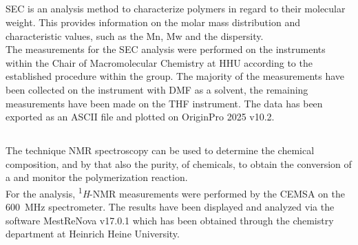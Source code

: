 \documentclass[11pt]{scrreport}
\begin{document}
	\subsection{}
	\Gls{SEC} is an analysis method to characterize polymers in regard to their molecular weight. This provides information on the molar mass distribution and characteristic values, such as the \gls{Mn}, \gls{Mw} and the \gls{dispersity}.\\
	The measurements for the \gls{SEC} analysis were performed on the instruments within the Chair of Macromolecular Chemistry at \gls{HHU} according to the established procedure within the group. The majority of the measurements have been collected on the instrument with \gls{DMF} as a solvent, the remaining measurements have been made on the \gls{THF} instrument. The data has been exported as an ASCII file and plotted on OriginPro 2025 v10.2.
	\subsection{}
	The technique \gls{NMR} spectroscopy can be used to determine the chemical composition, and by that also the purity, of chemicals, to obtain the conversion of a and monitor the polymerization reaction.\\
	For the analysis, \textsuperscript{1}\textit{H}-\gls{NMR} measurements were performed by the \gls{CEMSA} on the \SI{600}{\mega\hertz} spectrometer. The results have been displayed and analyzed via the software MestReNova v17.0.1 which has been obtained through the chemistry department at Heinrich Heine University.\newpage
\end{document}
